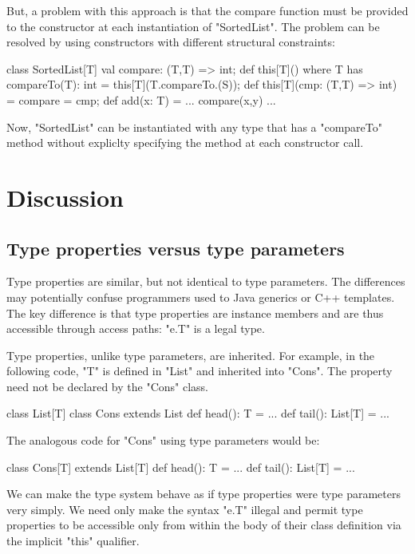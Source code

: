 \documentclass[preprint,nocopyrightspace,9pt]{sigplanconf}
\begin{document}
But, a problem with this approach is that the compare function must be
provided to the constructor at each instantiation of \xcd"SortedList".
The problem can be resolved by using constructors with different
structural constraints:
\begin{xten}
class SortedList[T] {
    val compare: (T,T) => int;
    def this[T]() where T has compareTo(T): int = {
        this[T](T.compareTo.(S));
    }
    def this[T](cmp: (T,T) => int) = { compare = cmp; }
    def add(x: T) = { ... compare(x,y) ... }
}
\end{xten}
Now, \xcd"SortedList" can be instantiated with any type that has
a \xcd"compareTo"
method without expliclty specifying the method at each constructor call.

\section{Discussion}

\subsection{Type properties versus type parameters}

Type properties are similar, but not identical to type parameters.  The
differences may potentially confuse programmers used to Java generics or C++
templates.  The key difference is that type properties are instance members and
are thus accessible through access paths: \xcd"e.T" is a legal type.

Type properties, unlike type parameters, are inherited.
For example, in the following code, \xcd"T" is defined in \xcd"List"
and inherited into \xcd"Cons".  The property need not be
declared by the \xcd"Cons" class.
\begin{xten}
class List[T] { }
class Cons extends List {
    def head(): T = { ... }
    def tail(): List[T] = { ... }
}
\end{xten}
The analogous code for \xcd"Cons" using type parameters would be:
\begin{xten}
class Cons[T] extends List[T] {
    def head(): T = { ... }
    def tail(): List[T] = { ... }
}
\end{xten}

We can make the type system behave as if type properties were
type parameters very simply.  We need only make the syntax \xcd"e.T"
illegal and permit type properties to be accessible only
from within the body of their class definition via the implicit \xcd"this"
qualifier.
\end{document}
